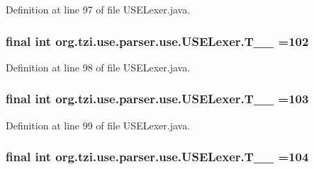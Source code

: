 Definition at line 97 of file U\-S\-E\-Lexer.\-java.

\hypertarget{classorg_1_1tzi_1_1use_1_1parser_1_1use_1_1_u_s_e_lexer_a928abe5476c5bb9cf93f315bc688b531}{
\subsubsection[{T\-\_\-\-\_\-102}]{\setlength{\rightskip}{0pt plus 5cm}final int org.\-tzi.\-use.\-parser.\-use.\-U\-S\-E\-Lexer.\-T\-\_\-\-\_ =102\hspace{0.3cm}{\ttfamily [static]}}}\label{classorg_1_1tzi_1_1use_1_1parser_1_1use_1_1_u_s_e_lexer_a928abe5476c5bb9cf93f315bc688b531}


Definition at line 98 of file U\-S\-E\-Lexer.\-java.

\hypertarget{classorg_1_1tzi_1_1use_1_1parser_1_1use_1_1_u_s_e_lexer_a936efb9c84e39374c6a19bcd16ee26e1}{
\subsubsection[{T\-\_\-\-\_\-103}]{\setlength{\rightskip}{0pt plus 5cm}final int org.\-tzi.\-use.\-parser.\-use.\-U\-S\-E\-Lexer.\-T\-\_\-\-\_ =103\hspace{0.3cm}{\ttfamily [static]}}}\label{classorg_1_1tzi_1_1use_1_1parser_1_1use_1_1_u_s_e_lexer_a936efb9c84e39374c6a19bcd16ee26e1}


Definition at line 99 of file U\-S\-E\-Lexer.\-java.

\hypertarget{classorg_1_1tzi_1_1use_1_1parser_1_1use_1_1_u_s_e_lexer_a5bf202f6baa8f9a31580b5fe8eefbb89}{
\subsubsection[{T\-\_\-\-\_\-104}]{\setlength{\rightskip}{0pt plus 5cm}final int org.\-tzi.\-use.\-parser.\-use.\-U\-S\-E\-Lexer.\-T\-\_\-\-\_ =104\hspace{0.3cm}{\ttfamily [static]}}}\label{classorg_1_1tzi_1_1use_1_1parser_1_1use_1_1_u_s_e_lexer_a5bf202f6baa8f9a31580b5fe8eefbb89}


